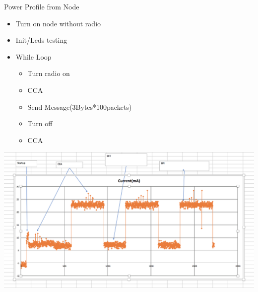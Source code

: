 \documentclass{article}
\begin{document}
\large{Power Profile from Node}
\begin{itemize}
	\item Turn on node without radio
	\item Init/Leds testing
	\item While Loop
	\begin{itemize}
		\item Turn radio on
		\item CCA
		\item Send Message(3Bytes*100packets)
		\item Turn off
		\item CCA
	\end{itemize}
\end{itemize}

\includegraphics[scale=0.5]{power_profile}
\end{document}
